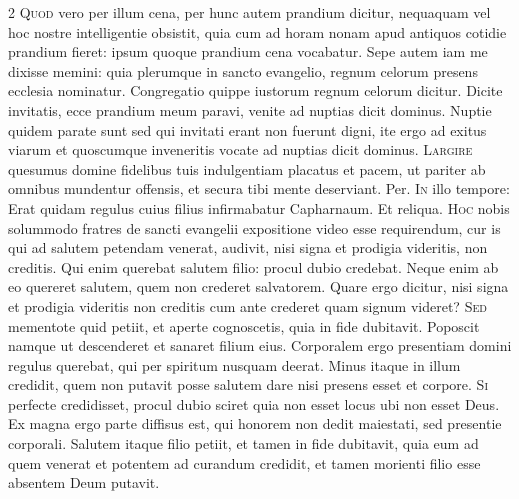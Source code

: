 \begin{multicols*}{2}
\lettrine[lines=2]{\zallmancaps \color{Blue} Q}{uod} vero per illum cena, per hunc autem prandium dicitur, nequaquam vel hoc nostre intelligentie obsistit, quia cum ad horam nonam apud antiquos cotidie prandium fieret: ipsum quoque prandium cena vocabatur. Sepe autem iam me dixisse memini: quia plerumque in sancto evangelio, regnum celorum presens ecclesia nominatur. Congregatio quippe iustorum regnum celorum dicitur.
 Dicite invitatis, ecce prandium meum paravi, venite ad nuptias dicit dominus.
 Nuptie quidem parate sunt sed qui invitati erant non fuerunt digni, ite ergo ad exitus viarum et quoscumque inveneritis vocate ad nuptias dicit dominus.
\lettrine[lines=2]{\zallmancaps \color{Red} L}{argire} quesumus domine fidelibus tuis indulgentiam placatus et pacem, ut pariter ab omnibus mundentur offensis, et secura tibi mente deserviant. Per.
\lettrine[lines=2]{\zallmancaps \color{Blue} I}{n} illo tempore: Erat quidam regulus cuius filius infirmabatur Capharnaum. Et reliqua.
 \grecross
\lettrine[lines=2]{\zallmancaps \color{Red} H}{oc} nobis solummodo fratres de sancti evangelii expositione video esse requirendum, cur is qui ad salutem petendam venerat, audivit, nisi signa et prodigia videritis, non creditis. Qui enim querebat salutem filio: procul dubio credebat. Neque enim ab eo quereret salutem, quem non crederet salvatorem. Quare ergo dicitur, nisi signa et prodigia videritis non creditis cum ante crederet quam signum videret?
\lettrine[lines=2]{\zallmancaps \color{Blue} S}{ed} mementote quid petiit, et aperte cognoscetis, quia in fide dubitavit. Poposcit namque ut descenderet et sanaret filium eius. Corporalem ergo presentiam domini regulus querebat, qui per spiritum nusquam deerat. Minus itaque in illum credidit, quem non putavit posse salutem dare nisi presens esset et corpore.
\lettrine[lines=2]{\zallmancaps \color{Red} S}{i} perfecte credidisset, procul dubio sciret quia non esset locus ubi non esset Deus. Ex magna ergo parte diffisus est, qui honorem non dedit maiestati, sed presentie corporali. Salutem itaque filio petiit, et tamen in fide dubitavit, quia eum ad quem venerat et potentem ad curandum credidit, et tamen morienti filio esse absentem Deum putavit.

\end{multicols*}
